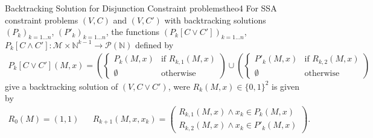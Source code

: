 \begin{theorem}{Backtracking Solution for Disjunction Constraint problems}{theo4}
    For SSA constraint problems $(V,C)$ and $(V,C')$ with backtracking
    solutions $(P_k)_{k=1\dots n}$, $(P'_k)_{k=1\dots n}$, the
    functions $(P_k[C\mathrel\lor C'])_{k=1\dots n}$,
    $P_k[C\mathrel\land C']\colon\mathcal M\times\mathbb N^{k-1}\rightarrow\mathcal P(\mathbb N)$
    defined by
    \begin{align*}
        P_k[C\mathrel\lor C'](M,x)=\left(\left\{
            \begin{array}{ll}
                P_k(M,x)&\text{if }R_{k,1}(M,x)\\
                \emptyset&\text{otherwise}
            \end{array}
            \right)\cup\left(\left\{
            \begin{array}{ll}
                P'_k(M,x)&\text{if }R_{k,2}(M,x)\\
                \emptyset&\text{otherwise}
            \end{array} 
            \right)
    \end{align*}
    give a backtracking solution of $(V,C\mathrel\lor C')$, were $R_k(M,x)\in\{0,1\}^2$
    is given by 
    \begin{align*}
        R_0(M)=(1,1)&&
        R_{k+1}(M,x,x_k)=\left(
            \begin{array}{l}
                R_{k,1}(M,x)\mathrel\land x_k\in P_k(M,x)\\
                R_{k,2}(M,x)\mathrel\land x_k\in P'_k(M,x)
            \end{array}\right).
    \end{align*}
    \tcblower

\end{theorem}
